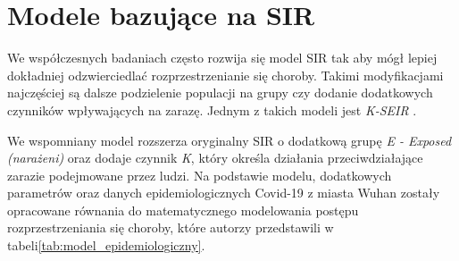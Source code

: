 \section{\textbf{Modele bazujące na SIR}}

We współczesnych badaniach często rozwija się model SIR tak aby mógł lepiej dokładniej odzwierciedlać rozprzestrzenianie się choroby. Takimi modyfikacjami najczęściej są dalsze podzielenie populacji na grupy czy dodanie dodatkowych czynników wpływających na zarazę. Jednym z takich modeli jest \textit {K-SEIR}
\cite{bib:artykul} .

We wspomniany model rozszerza oryginalny SIR o dodatkową grupę \textit { E - Exposed (narażeni)} oraz dodaje czynnik \textit {K}, który określa działania przeciwdziałające zarazie podejmowane przez ludzi. Na podstawie modelu, dodatkowych parametrów oraz danych epidemiologicznych Covid-19 z miasta Wuhan zostały opracowane równania do matematycznego modelowania postępu rozprzestrzeniania się choroby, które autorzy przedstawili w tabeli\ref{tab:model_epidemiologiczny}.

